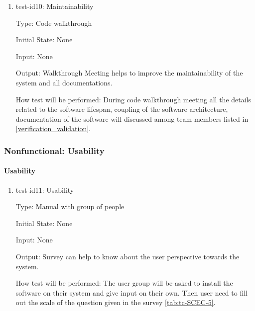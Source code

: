 \documentclass[12pt, titlepage]{article}
\begin{document}
\begin{enumerate}
					
\item{test-id10: Maintainability\\}

Type: Code walkthrough
					
Initial State: None 
					
Input: None 
					
Output: Walkthrough Meeting helps to improve the maintainability of the system and all documentations. 
					
How test will be performed: During code walkthrough meeting all the details related to the software lifespan, coupling of the software architecture, documentation of the software will discussed among team members listed in \autoref{verification_validation}.

\end{enumerate}


\subsubsection{Nonfunctional: Usability}
\label{non_functional_usability}	
\paragraph{Usability}

\begin{enumerate}
					
\item{test-id11: Usability\\}

Type: Manual with group of people
					
Initial State: None 
					
Input: None 
					
Output: Survey can help to know about the user perspective towards the system. 
					
How test will be performed: The user group will be asked to install the software on their system and give input on their own. Then user need to fill out the scale of the question given in the survey \autoref{tab:tc-SCEC-5}.

\end{enumerate}
\end{document}
